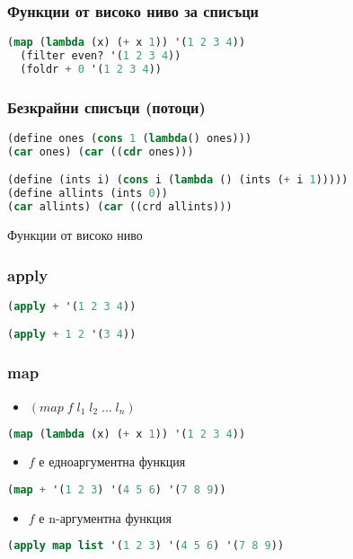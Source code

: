 \documentclass{beamer}
\begin{document}
\begin{frame}[fragile]
\frametitle{Функции от високо ниво за списъци}

\begin{lstlisting}[language=Lisp]
  (map (lambda (x) (+ x 1)) '(1 2 3 4))
  (filter even? '(1 2 3 4))
  (foldr + 0 '(1 2 3 4))
\end{lstlisting}

\end{frame}


\begin{frame}[fragile]
\frametitle{Безкрайни списъци (потоци)}

\begin{lstlisting}[language=Lisp]
(define ones (cons 1 (lambda() ones)))
(car ones) (car ((cdr ones)))

(define (ints i) (cons i (lambda () (ints (+ i 1)))))
(define allints (ints 0))
(car allints) (car ((crd allints)))
\end{lstlisting}

\end{frame}

\begin{frame}
  \centerline{Функции от високо ниво}
\end{frame}

\begin{frame}[fragile]
\frametitle{apply}
\begin{lstlisting}[language=Lisp]
(apply + '(1 2 3 4))

(apply + 1 2 '(3 4))
\end{lstlisting}
\end{frame}

\begin{frame}[fragile]
\frametitle{map}

\begin{itemize}
  \item $(map \; f \; l_1 \; l_2 \; ... \; l_n)$
\end{itemize}

\begin{lstlisting}[language=Lisp]
(map (lambda (x) (+ x 1)) '(1 2 3 4))
\end{lstlisting}
\begin{itemize}
  \item $f$ е едноаргументна функция
\end{itemize}

\begin{lstlisting}[language=Lisp]
(map + '(1 2 3) '(4 5 6) '(7 8 9))
\end{lstlisting}
\begin{itemize}
  \item $f$ е n-аргументна функция
\end{itemize}

\begin{lstlisting}[language=Lisp]
(apply map list '(1 2 3) '(4 5 6) '(7 8 9))
\end{lstlisting}

\end{frame}





\end{document}
